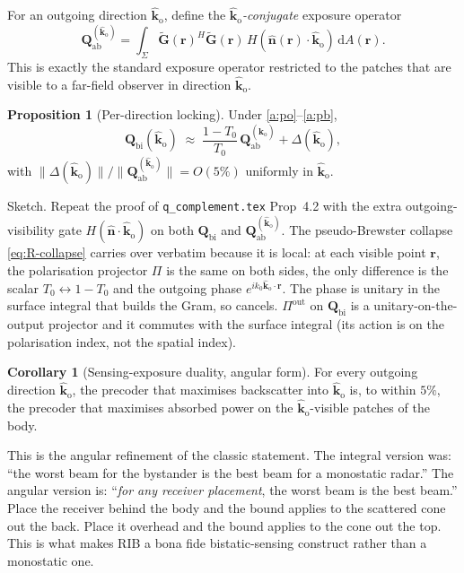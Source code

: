 \documentclass[11pt,a4paper]{article}
\theoremstyle{definition}
\newtheorem{proposition}[proposition]{Proposition}
\newtheorem{corollary}[corollary]{Corollary}
\newcommand{\nhat}{\hat{\bm{n}}}
\newcommand{\rr}{\mathbf{r}}
\newcommand{\diff}{\mathrm{d}}
\newcommand{\Gtil}{\tilde{\mathbf{G}}}
\newcommand{\Qabs}{\mathbf{Q}_{\mathrm{ab}}}
\newcommand{\kout}{\hat{\bm{k}}_{\mathrm{o}}}
\newcommand{\Qbist}{\mathbf{Q}_{\mathrm{bi}}}
\begin{document}
For an outgoing direction $\kout$, define the
\emph{$\kout$-conjugate} exposure operator
\begin{equation}\label{eq:Qabs-kout}
  \Qabs^{(\kout)}=\!\!\int_\Sigma\!\!
  \Gtil(\rr)^H\Gtil(\rr)\,
  H(\nhat(\rr)\cdot\kout)\,\diff A(\rr).
\end{equation}
This is exactly the standard exposure operator restricted to the
patches that are visible to a far-field observer in direction $\kout$.

\begin{proposition}[Per-direction locking]\label{prop:perdir}
Under \ref{a:po}--\ref{a:pb},
\begin{equation}\label{eq:perdir}
  \Qbist(\kout)\;\approx\;
  \frac{1-T_0}{T_0}\,\Qabs^{(\kout)} + \Delta(\kout),
\end{equation}
with $\|\Delta(\kout)\|/\|\Qabs^{(\kout)}\|=O(5\%)$ uniformly in
$\kout$.
\end{proposition}

Sketch.  Repeat the proof of \texttt{q\_complement.tex} Prop~4.2 with
the extra outgoing-visibility gate $H(\nhat\cdot\kout)$ on both
$\Qbist$ and $\Qabs^{(\kout)}$.  The pseudo-Brewster collapse
\cref{eq:R-collapse} carries over verbatim because it is local: at
each visible point $\rr$, the polarisation projector $\Pi$ is the
same on both sides, the only difference is the scalar
$T_0\leftrightarrow 1-T_0$ and the outgoing phase
$e^{ik_0\kout\cdot\rr}$.  The phase is unitary in the surface
integral that builds the Gram, so cancels.  $\Pi^{\mathrm{out}}$ on
$\Qbist$ is a unitary-on-the-output projector and it commutes with
the surface integral (its action is on the polarisation index, not
the spatial index).

\begin{corollary}[Sensing-exposure duality, angular form]
For every outgoing direction $\kout$, the precoder that maximises
backscatter into $\kout$ is, to within $5\%$, the precoder that
maximises absorbed power on the $\kout$-visible patches of the body.
\end{corollary}

This is the angular refinement of the classic statement.  The integral
version was: ``the worst beam for the bystander is the best beam for a
monostatic radar.''  The angular version is: ``\emph{for any
receiver placement}, the worst beam is the best beam.''  Place the
receiver behind the body and the bound applies to the scattered cone
out the back.  Place it overhead and the bound applies to the cone
out the top.  This is what makes RIB a bona fide bistatic-sensing
construct rather than a monostatic one.
\end{document}
